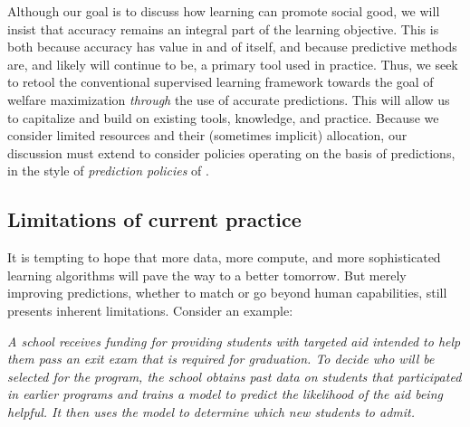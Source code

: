  
Although our goal is to discuss how learning can promote social good,
we will insist that accuracy remains an integral part of the learning objective.
This is both because accuracy has value in and of itself,
and because predictive methods are, and likely will continue to be,
a primary tool used in practice.
Thus, we seek to retool the conventional supervised learning framework
towards the goal of welfare maximization \emph{through} the use of accurate predictions.
This will allow us to capitalize and build on existing tools, knowledge, and practice.
  Because we consider limited resources and their (sometimes implicit) allocation, our discussion must extend to consider policies operating on    the basis   of predictions,   in the style of    \emph{prediction policies} of  \cite{kleinberg2015prediction}. 
 
 

\subsection{Limitations of current practice}

It is tempting to hope that more data, more compute, and more sophisticated learning algorithms will pave the way to a better tomorrow.
But merely improving predictions, whether to match or go beyond human capabilities,
still presents inherent limitations.
Consider an example:


\textit{%
A school receives funding for providing students with targeted aid intended to help them pass an exit exam that is required for graduation.
To decide who will be selected for the program,
the school obtains past data on students that participated in earlier programs and trains a model to predict the likelihood of the aid being helpful.
It then uses the model to determine which new students to admit.
}

